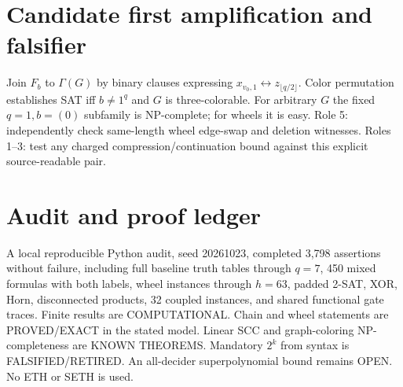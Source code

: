 \documentclass{article}
\begin{document}
\section*{Candidate first amplification and falsifier}
Join $F_b$ to $\Gamma(G)$ by binary clauses expressing $x_{v_0,1}\leftrightarrow z_{\lfloor q/2\rfloor}$. Color permutation establishes SAT iff $b\ne1^q$ and $G$ is three-colorable. For arbitrary $G$ the fixed $q=1,b=(0)$ subfamily is NP-complete; for wheels it is easy. Role 5: independently check same-length wheel edge-swap and deletion witnesses. Roles 1--3: test any charged compression/continuation bound against this explicit source-readable pair.
\section*{Audit and proof ledger}
A local reproducible Python audit, seed 20261023, completed 3,798 assertions without failure, including full baseline truth tables through $q=7$, 450 mixed formulas with both labels, wheel instances through $h=63$, padded 2-SAT, XOR, Horn, disconnected products, 32 coupled instances, and shared functional gate traces. Finite results are COMPUTATIONAL. Chain and wheel statements are PROVED/EXACT in the stated model. Linear SCC and graph-coloring NP-completeness are KNOWN THEOREMS. Mandatory $2^k$ from syntax is FALSIFIED/RETIRED. An all-decider superpolynomial bound remains OPEN. No ETH or SETH is used.
\end{document}
